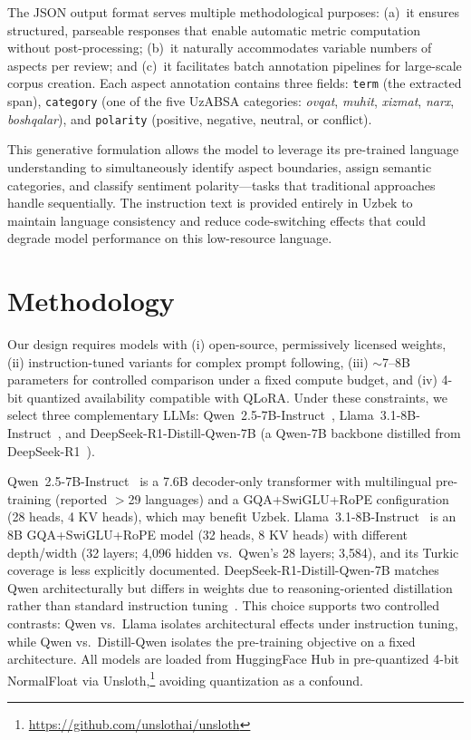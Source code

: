 \documentclass[computers,article,submit,pdftex,moreauthors]{Definitions/mdpi}
\begin{document}
The JSON output format serves multiple methodological purposes: (a)~it ensures structured, parseable responses that enable automatic metric computation without post-processing; (b)~it naturally accommodates variable numbers of aspects per review; and (c)~it facilitates batch annotation pipelines for large-scale corpus creation. Each aspect annotation contains three fields: \texttt{term} (the extracted span), \texttt{category} (one of the five UzABSA categories: \textit{ovqat}, \textit{muhit}, \textit{xizmat}, \textit{narx}, \textit{boshqalar}), and \texttt{polarity} (positive, negative, neutral, or conflict).

This generative formulation allows the model to leverage its pre-trained language understanding to simultaneously identify aspect boundaries, assign semantic categories, and classify sentiment polarity---tasks that traditional approaches handle sequentially. The instruction text is provided entirely in Uzbek to maintain language consistency and reduce code-switching effects that could degrade model performance on this low-resource language.




\section{Methodology}
\label{sec:methodology}

Our design requires models with (i) open-source, permissively licensed weights, (ii) instruction-tuned variants for complex prompt following, (iii) $\sim$7--8B parameters for controlled comparison under a fixed compute budget, and (iv) 4-bit quantized availability compatible with QLoRA. Under these constraints, we select three complementary LLMs: Qwen~2.5-7B-Instruct~\cite{Qwen2024-kr}, Llama~3.1-8B-Instruct~\cite{Grattafiori2024-ka}, and DeepSeek-R1-Distill-Qwen-7B (a Qwen-7B backbone distilled from DeepSeek-R1~\cite{DeepSeek-AI2026-vt}).

Qwen~2.5-7B-Instruct~\cite{Qwen2024-kr} is a 7.6B decoder-only transformer with multilingual pre-training (reported $>$29 languages) and a GQA+SwiGLU+RoPE configuration (28 heads, 4 KV heads), which may benefit Uzbek. Llama~3.1-8B-Instruct~\cite{Grattafiori2024-ka} is an 8B GQA+SwiGLU+RoPE model (32 heads, 8 KV heads) with different depth/width (32 layers; 4{,}096 hidden vs.\ Qwen's 28 layers; 3{,}584), and its Turkic coverage is less explicitly documented. DeepSeek-R1-Distill-Qwen-7B matches Qwen architecturally but differs in weights due to reasoning-oriented distillation rather than standard instruction tuning~\cite{DeepSeek-AI2026-vt}. This choice supports two controlled contrasts: Qwen vs.\ Llama isolates architectural effects under instruction tuning, while Qwen vs.\ Distill-Qwen isolates the pre-training objective on a fixed architecture. All models are loaded from HuggingFace Hub in pre-quantized 4-bit NormalFloat via Unsloth,\footnote{\url{https://github.com/unslothai/unsloth}} avoiding quantization as a confound.
\end{document}
